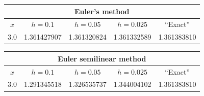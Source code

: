 \bigskip

{\small
\begin{tabular}{|c|r|r|r|r|}
\hline
\multicolumn{5}{|c|}{Euler's method}\\\hline
\multicolumn{1}{|c|}{$x$}&
\multicolumn{1}{|c|}{$h=0.1$}&
\multicolumn{1}{|c|}{$h=0.05$}&
\multicolumn{1}{|c|}{$h=0.025$}&
\multicolumn{1}{|c|}{``Exact''}\\ \hline
3.0 & 1.361427907 & 1.361320824 & 1.361332589 & 1.361383810 \\
\hline
\end{tabular}}

\bigskip

\hspace{.75in}
{\small
\begin{tabular}{|c|r|r|r|r|}
\hline
\multicolumn{5}{|c|}{Euler semilinear method}\\\hline
\multicolumn{1}{|c|}{$x$}&
\multicolumn{1}{|c|}{$h=0.1$}&
\multicolumn{1}{|c|}{$h=0.05$}&
\multicolumn{1}{|c|}{$h=0.025$}&
\multicolumn{1}{|c|}{``Exact''}\\ \hline
3.0 & 1.291345518 & 1.326535737 & 1.344004102 & 1.361383810 \\
\hline
\end{tabular}}

